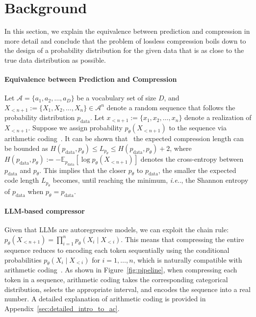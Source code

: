 \documentclass[11pt]{article}
\makeatletter
\DeclareRobustCommand\onedot{\futurelet\@let@token\@onedot}
\def\@onedot{\ifx\@let@token.\else.\null\fi\xspace}
\def\ie{\emph{i.e}\onedot} \def\Ie{\emph{I.e}\onedot}
\makeatother
\begin{document}
\section{Background}
In this section, we explain the equivalence between prediction and compression in more detail and conclude that the problem of lossless compression boils down to the design of a probability distribution for the given data that is as close to the true data distribution as possible.

\paragraph{Equivalence between Prediction and Compression}Let $\mathcal{A} = \{a_1, a_2, \ldots, a_D\}$ be a vocabulary set of size $D$, and $X_{<n+1} := \{X_1, X_2, \ldots, X_n\}\in\mathcal{A}^n$ denote a random sequence that follows the  probability distribution $p_{\text{data}}$. Let $x_{<n+1}:= \{x_1, x_2, \ldots, x_n\}$  denote a realization of $X_{<n+1}$.
Suppose we assign probability $p_\theta(X_{<n+1})$ to the sequence via arithmetic coding~\citep{pasco1977source, rissanen1976generalized}. It can be shown that~\cite{cover1999elements} the expected compression length can be bounded as $H(p_{\text{data}}, p_{\theta}) \le L_{p_{\theta}} \le H(p_{\text{data}}, p_{\theta})+2$, where $H(p_{\text{data}}, p_{\theta}) := - \mathbb{E}_{p_{\text{data}}} \left[ \log {p_{\theta}(X_{<n+1})} \right]$ denotes the cross-entropy between $ p_{\text{data}}$ and $p_{\theta}$. This implies that the closer $p_{\theta}$ to $ p_{\text{data}} $, the smaller the expected code length $ L_{p_{\theta}}$ becomes, until reaching the minimum, \ie, the Shannon entropy of $p_{\text{data}}$ when $ p_{\theta}= p_{\text{data}}$.

\paragraph{LLM-based compressor}  
\label{subsect:ac_autoregressive_model}
Given that LLMs are autoregressive models, we can exploit the chain rule:  
$
p_\theta(X_{<n+1}) = \prod_{i=1}^n p_\theta(X_i \mid X_{<i}).
$  
This means that compressing the entire sequence reduces to encoding each token sequentially using the conditional probabilities $p_\theta(X_i \mid X_{<i})$ for $i = 1, \ldots, n$, which is naturally compatible with arithmetic coding~\citep{pasco1977source, rissanen1976generalized}. As shown in Figure~\ref{fig:pipeline}, when compressing each token in a sequence, arithmetic coding takes the corresponding categorical distribution, selects the appropriate interval, and encodes the sequence into a real number. A detailed explanation of arithmetic coding is provided in Appendix~\ref{sec:detailed_intro_to_ac}.
\end{document}
